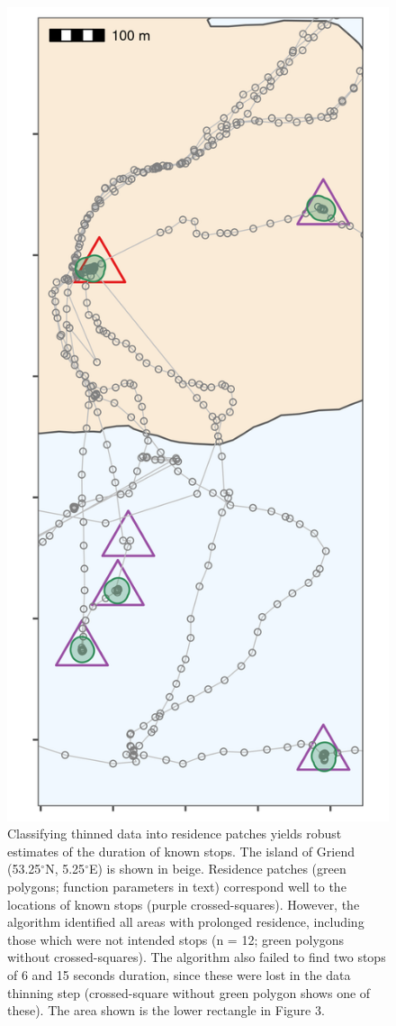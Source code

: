 \documentclass[
]{scrartcl}
\begin{document}
\begin{figure}
\centering
\includegraphics{figures/fig_calib_residence.png}
\caption{Classifying thinned data into residence patches yields robust estimates of the duration of known stops. The island of Griend (53.25\(^{\circ}\)N, 5.25\(^{\circ}\)E) is shown in beige. Residence patches (green polygons; function parameters in text) correspond well to the locations of known stops (purple crossed-squares). However, the algorithm identified all areas with prolonged residence, including those which were not intended stops (n = 12; green polygons without crossed-squares). The algorithm also failed to find two stops of 6 and 15 seconds duration, since these were lost in the data thinning step (crossed-square without green polygon shows one of these). The area shown is the lower rectangle in Figure 3.}
\end{figure}
\end{document}
